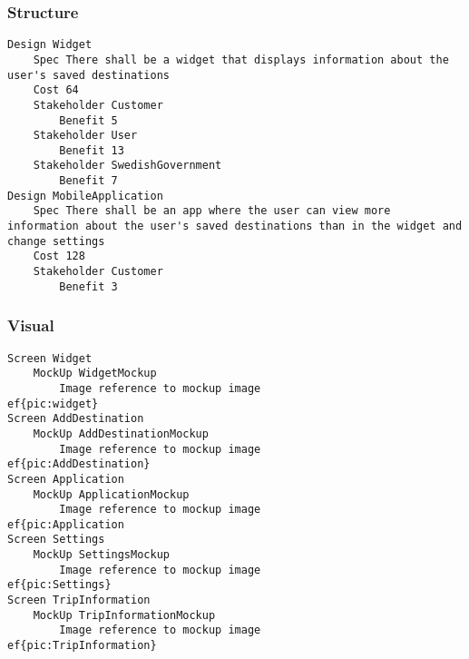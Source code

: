 \begin{lstlisting}

\end{lstlisting}


			 \subsubsection{Structure}


\begin{lstlisting}
Design Widget
	Spec There shall be a widget that displays information about the user's saved destinations
	Cost 64
	Stakeholder Customer
		Benefit 5
	Stakeholder User
		Benefit 13
	Stakeholder SwedishGovernment
		Benefit 7
Design MobileApplication
	Spec There shall be an app where the user can view more information about the user's saved destinations than in the widget and change settings
	Cost 128
	Stakeholder Customer
		Benefit 3

\end{lstlisting}
		
				
			 \subsubsection{Visual}


\begin{lstlisting}
Screen Widget
	MockUp WidgetMockup
		Image reference to mockup image 
ef{pic:widget}
Screen AddDestination
	MockUp AddDestinationMockup
		Image reference to mockup image 
ef{pic:AddDestination}
Screen Application
	MockUp ApplicationMockup
		Image reference to mockup image 
ef{pic:Application
Screen Settings
	MockUp SettingsMockup
		Image reference to mockup image 
ef{pic:Settings}
Screen TripInformation
	MockUp TripInformationMockup
		Image reference to mockup image 
ef{pic:TripInformation}

\end{lstlisting}